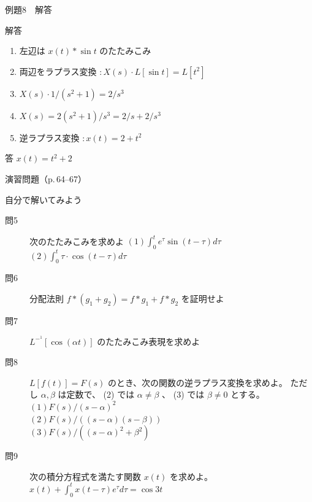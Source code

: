 \documentclass[aspectratio=43,professionalfonts,handout]{beamer}
\begin{document}
\begin{frame}{例題8　解答}
  \begin{exampleblock}{解答}
  \begin{enumerate}[1.]
    \item[] 左辺は $x(t) * \sin t$ のたたみこみ
    \item[] 両辺をラプラス変換 $: X(s) \cdot L[\sin t] = L[t^{2}]$
    \item[] $X(s) \cdot 1/(s^{2}+1) = 2/s^{3}$
    \item[] $X(s) = 2(s^{2}+1)/s^{3} = 2/s + 2/s^{3}$
    \item[] 逆ラプラス変換 $: x(t) = 2 + t^{2}$
  \end{enumerate}
  \end{exampleblock}
  \begin{alertblock}{答}
    $x(t) = t^{2} + 2$
  \end{alertblock}
\end{frame}

\begin{frame}{演習問題（p.\,64--67）}
  \begin{exampleblock}{自分で解いてみよう}
  \begin{description}
    \item[問5] 次のたたみこみを求めよ
    $(1) \int_{0}^t e^\tau \sin(t-\tau) d\tau$\\
    $(2) \int_{0}^t \tau\cdot \cos(t-\tau) d\tau$\\
    \item[問6] 分配法則 $f*(g_{1}+g_{2}) = f*g_{1} + f*g_{2}$ を証明せよ
    \item[問7] $L^{-}^{1}[\cos(\alpha t)]$ のたたみこみ表現を求めよ
    \item[問8] $L[f(t)] = F(s)$ のとき、次の関数の逆ラプラス変換を求めよ。
    ただし $\alpha, \beta$ は定数で、 (2) では $\alpha \neq \beta$ 、 (3) では $\beta \neq 0$ とする。\\
    $(1) F(s)/(s-\alpha)^{2}$\\
    $(2) F(s)/((s-\alpha)(s-\beta))$\\
    $(3) F(s)/((s-\alpha)^{2}+\beta^{2})$\\
    \item[問9] 次の積分方程式を満たす関数 $x(t)$ を求めよ。
    $x(t) + \int_{0}^t x(t-\tau)e^\tau d\tau = \cos 3t$\\
  \end{description}
  \end{exampleblock}
\end{frame}
\end{document}
